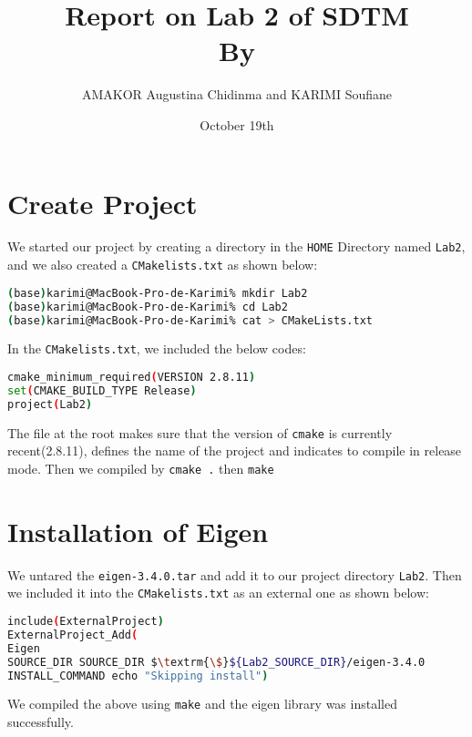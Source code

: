 \documentclass[11pt]{article}
\title{Report on Lab 2 of SDTM \\
 By\\
  
  \textbf{}}
\author{AMAKOR Augustina Chidinma and KARIMI Soufiane}
\date{October 19th}
\begin{document}
\maketitle
\setcounter{tocdepth}{2}
\tableofcontents
\vspace*{1cm}

\setcounter{tocdepth}{2}
\vspace*{1cm}




\section{Create Project}

We started our project by creating a directory in the \texttt{HOME} Directory named \texttt{Lab2}, and we also created a \texttt{CMakelists.txt} as shown below:\\

\begin{lstlisting}[language={sh}]
(base)karimi@MacBook-Pro-de-Karimi% mkdir Lab2
(base)karimi@MacBook-Pro-de-Karimi% cd Lab2
(base)karimi@MacBook-Pro-de-Karimi% cat > CMakeLists.txt
\end{lstlisting}
In the \texttt{CMakelists.txt}, we included the below codes:
\begin{lstlisting}[language={sh}]
cmake_minimum_required(VERSION 2.8.11)
set(CMAKE_BUILD_TYPE Release)
project(Lab2)
\end{lstlisting}

The file at the root makes sure that the version of \texttt{cmake} is currently recent(2.8.11), defines the name of the project and indicates to compile in release mode.
Then we compiled by \texttt{cmake .} then \texttt{make}

\section{Installation of Eigen}
We untared the \texttt{eigen-3.4.0.tar} and add it to our project directory \texttt{Lab2}. Then we included it into the \texttt{CMakelists.txt} as an external one as shown below:\\

\begin{lstlisting}[language={sh}]
include(ExternalProject)
ExternalProject_Add(
Eigen
SOURCE_DIR SOURCE_DIR $\textrm{\$}${Lab2_SOURCE_DIR}/eigen-3.4.0
INSTALL_COMMAND echo "Skipping install")
\end{lstlisting}

We compiled the above using \texttt{make} and the eigen library was installed successfully.
\end{document}
